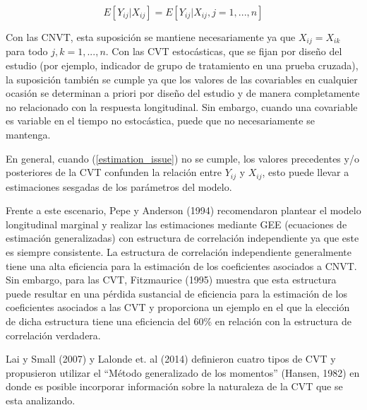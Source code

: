 \documentclass[spanish]{article}
\numberwithin{figure}{subsection}
\numberwithin{equation}{subsection}
\numberwithin{table}{subsection}
\begin{document}

\begin{equation}
\label{estimation_issue}
	E[Y_{ij} | X_{ij}] = E[Y_{ij} | X_{ij}, j = 1, ..., n]
\end{equation}

Con las CNVT, esta suposición se mantiene necesariamente ya que $X_{ij} =
X_{ik}$ para todo $j, k = 1, ..., n$. Con las CVT estocásticas, que se
fijan por diseño del estudio (por ejemplo, indicador de grupo de tratamiento en
una prueba cruzada), la suposición también se cumple ya que los valores de las
covariables en cualquier ocasión se determinan a priori por diseño del estudio y
de manera completamente no relacionado con la respuesta longitudinal. Sin
embargo, cuando una covariable es variable en el tiempo no estocástica, puede
que no necesariamente se mantenga.

En general, cuando (\ref{estimation_issue}) no se cumple, los valores
precedentes y/o posteriores de la CVT confunden la relación entre $Y_{ij}$ y
$X_{ij}$, esto puede llevar a estimaciones sesgadas de los parámetros del
modelo.

Frente a este escenario, Pepe y Anderson (1994) recomendaron plantear el modelo
longitudinal marginal y realizar las estimaciones mediante GEE (ecuaciones de
estimación generalizadas) con estructura de correlación independiente ya que
este es siempre consistente. La estructura de correlación independiente
generalmente tiene una alta eficiencia para la estimación de los coeficientes
asociados a CNVT. Sin embargo, para las CVT, Fitzmaurice (1995) muestra que esta
estructura puede resultar en una pérdida sustancial de eficiencia para la
estimación de los coeficientes asociados a las CVT y proporciona un ejemplo en
el que la elección de dicha estructura tiene una eficiencia del 60\% en relación
con la estructura de correlación verdadera.

Lai y Small (2007) y Lalonde et. al (2014) definieron cuatro tipos de CVT y
propusieron utilizar el ``Método generalizado de los momentos'' (Hansen, 1982)
en donde es posible incorporar información sobre la naturaleza de la CVT que se
esta analizando.

\end{document}

